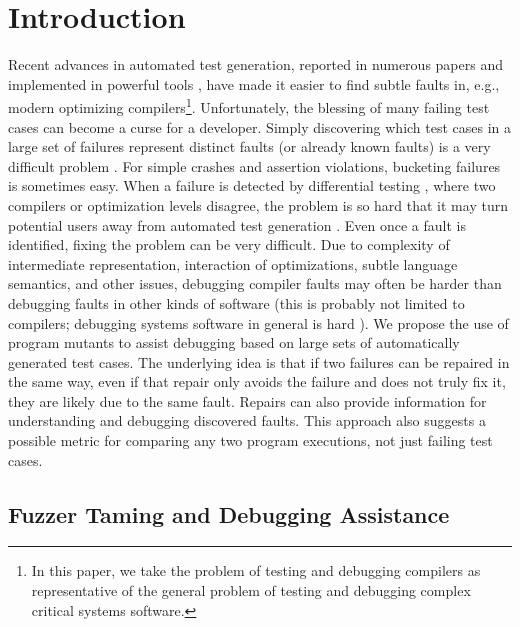 \section{Introduction}

Recent advances in automated test generation, reported in numerous papers and implemented in powerful tools \cite{csmith,jsfunfuzz,ISSTA12,LangFuzz,ZhendongPLDI,ZhendongOOPSLA}, have made it easier to find subtle faults in, e.g., modern optimizing compilers\footnote{In this paper, we take the problem of testing and debugging compilers as representative of the general problem of testing and debugging complex critical systems software.}.  Unfortunately, the blessing of many failing test cases can become a curse for a developer.  Simply discovering which test cases in a large set of failures represent distinct faults (or already known faults) is a very difficult problem \cite{PLDI13,Podgurski04}.  For simple crashes and assertion violations, bucketing failures is sometimes easy.  When a failure is detected by differential testing \cite{Differential}, where two compilers or optimization levels disagree, the problem is so hard that it may turn potential users away from automated test generation \cite{PLDI13}.  Even once a fault is identified, fixing the problem can be very difficult.  Due to complexity of intermediate representation, interaction of optimizations, subtle language semantics, and other issues, debugging compiler faults may often be harder than debugging faults in other kinds of software (this is probably not limited to compilers; debugging systems software in general is hard \cite{mickens}).
We propose the use of program mutants \cite{mutant} to assist debugging based on large sets of automatically generated test cases.  The underlying idea is that if two failures can be repaired in the same way, even if that repair only avoids the failure and does not truly fix it, they are likely due to the same fault. Repairs can also provide  information for understanding and debugging discovered faults. This approach also suggests a possible metric for comparing any two program executions, not just failing test cases.

\subsection{Fuzzer Taming and Debugging Assistance}

